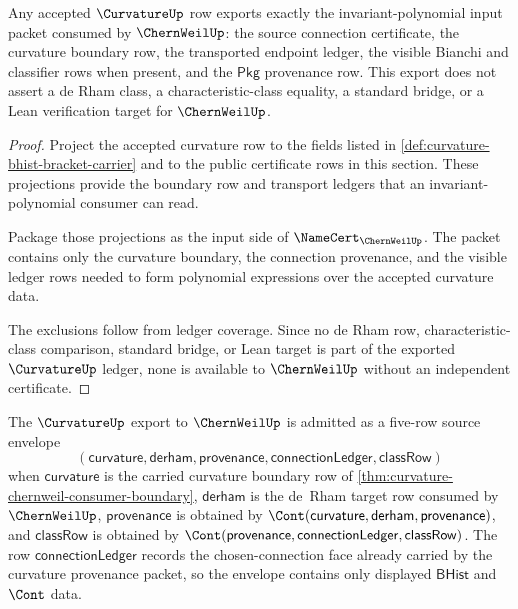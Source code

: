 \begin{theorem}
\label{thm:curvature-chernweil-consumer-boundary}
Any accepted $\CurvatureUp$ row exports exactly the invariant-polynomial input packet consumed by $\ChernWeilUp$: the source connection certificate, the curvature boundary row, the transported endpoint ledger, the visible Bianchi and classifier rows when present, and the $\mathsf{Pkg}$ provenance row. This export does not assert a de Rham class, a characteristic-class equality, a standard bridge, or a Lean verification target for $\ChernWeilUp$.
\end{theorem}
\begin{proof}
Project the accepted curvature row to the fields listed in \autoref{def:curvature-bhist-bracket-carrier} and to the public certificate rows in this section. These projections provide the boundary row and transport ledgers that an invariant-polynomial consumer can read.

Package those projections as the input side of $\NameCert_{\ChernWeilUp}$. The packet contains only the curvature boundary, the connection provenance, and the visible ledger rows needed to form polynomial expressions over the accepted curvature data.

The exclusions follow from ledger coverage. Since no de Rham row, characteristic-class comparison, standard bridge, or Lean target is part of the exported $\CurvatureUp$ ledger, none is available to $\ChernWeilUp$ without an independent certificate.
\end{proof}

\begin{definition}
\label{def:curvature-chernweil-input-envelope}
The $\CurvatureUp$ export to $\ChernWeilUp$ is admitted as a five-row source envelope
$$
(\mathsf{curvature},\mathsf{derham},\mathsf{provenance},\mathsf{connectionLedger},\mathsf{classRow})
$$
when $\mathsf{curvature}$ is the carried curvature boundary row of \autoref{thm:curvature-chernweil-consumer-boundary}, $\mathsf{derham}$ is the de~Rham target row consumed by $\ChernWeilUp$, $\mathsf{provenance}$ is obtained by $\Cont(\mathsf{curvature},\mathsf{derham},\mathsf{provenance})$, and $\mathsf{classRow}$ is obtained by $\Cont(\mathsf{provenance},\mathsf{connectionLedger},\mathsf{classRow})$. The row $\mathsf{connectionLedger}$ records the chosen-connection face already carried by the curvature provenance packet, so the envelope contains only displayed $\mathsf{BHist}$ and $\Cont$ data.
\end{definition}

